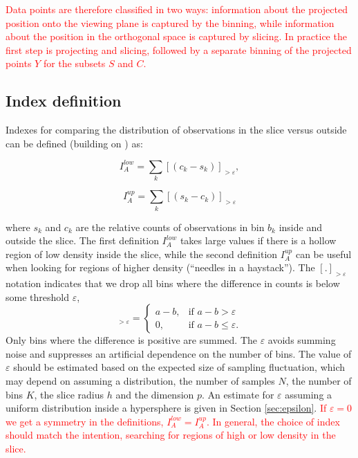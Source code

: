 \documentclass[]{interact}
\theoremstyle{plain}%
\theoremstyle{definition}
\theoremstyle{remark}
\begin{document}
\textcolor{red}{Data points are therefore classified in two ways: information about the projected position onto the viewing plane is captured by the binning, while information about the position in the orthogonal space is captured by slicing. In practice the first step is projecting and slicing, followed by a separate binning of the projected points $Y$ for the subsets $S$ and $C$.}

\hypertarget{index-definition}{%
\subsection{Index definition}\label{index-definition}}

Indexes for comparing the distribution of observations in the slice
versus outside can be defined (building on
\citet{doi:10.1198/1061860043119}) as:

\begin{equation}
I_A^{low} = \sum_{k}\left[\left(c_{k}-s_{k}\right)\right]_{>\varepsilon},
\label{eq:index}
\end{equation}

\begin{equation}
I_A^{up} = \sum_{k}\left[\left(s_{k}-c_{k}\right)\right]_{>\varepsilon}
\label{eq:indexup}
\end{equation}

\noindent where \(s_{k}\) and \(c_{k}\) are the relative counts of
observations in bin \(b_{k}\) inside and outside the slice. The first
definition \(I_A^{low}\) takes large values if there is a hollow region
of low density inside the slice, while the second definition
\(I_A^{up}\) can be useful when looking for regions of higher density
(``needles in a haystack''). The \([.]_{>\varepsilon}\) notation
indicates that we drop all bins where the difference in counts is below
some threshold \(\varepsilon\), \begin{equation}
[a - b]_{>\varepsilon} = \begin{cases}
    a - b, & \text{if $a - b > \varepsilon$}\\
    0, & \text{if $a-b \leq \varepsilon$.}
  \end{cases}
\end{equation} Only bins where the difference is positive are summed.
The \(\varepsilon\) avoids summing noise and suppresses an artificial
dependence on the number of bins. The value of \(\varepsilon\) should be
estimated based on the expected size of sampling fluctuation, which may
depend on assuming a distribution, the number of samples \(N\), the
number of bins \(K\), the slice radius \(h\) and the dimension \(p\). An
estimate for \(\varepsilon\) assuming a uniform distribution inside a
hypersphere is given in Section \ref{sec:epsilon}.
\textcolor{red}{If $\varepsilon=0$ we get a symmetry in the definitions,  $I_A^{low}=I_A^{up}$. In general, the choice of index should match the intention, searching for regions of high or low density in the slice.}
\end{document}
